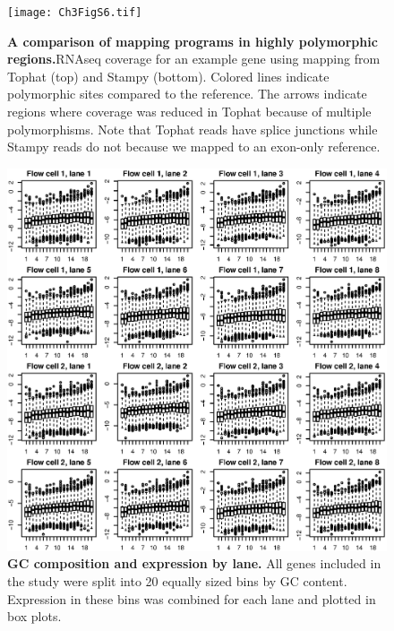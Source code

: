 \begin{figure}[ht]
      \centering
       \texttt{[image: Ch3FigS6.tif]}
    \caption{\textbf{A comparison of mapping programs in highly polymorphic regions.}RNAseq coverage for an example gene using mapping from Tophat (top) and Stampy (bottom). Colored lines indicate polymorphic sites compared to the reference. The arrows indicate regions where coverage was reduced in Tophat because of multiple polymorphisms. Note that Tophat reads have splice junctions while Stampy reads do not because we mapped to an exon-only reference.}
    \label{fig:3figS6}
\end{figure}

\begin{figure}[ht]
      \centering
       \includegraphics[width=\linewidth]{Ch3FigS7}
    \caption{\textbf{GC composition and expression by lane.} All genes included in the study were split into 20 equally sized bins by GC content. Expression in these bins was combined for each lane and plotted in box plots.}
    \label{fig:3figS7}
\end{figure}

